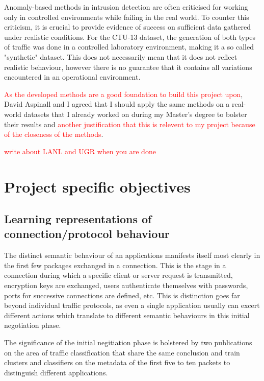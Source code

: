 \documentclass[a4paper,12pt,twoside]{report}
\begin{document}
Anomaly-based methods in intrusion detection are often criticised for working only in controlled environments while failing in the real world. To counter this criticism, it is crucial to provide evidence of success on sufficient data gathered under realistic conditions. For the CTU-13 dataset, the generation of both types of traffic was done in a controlled laboratory environment, making it a so called "synthetic" dataset. This does not necessarily mean that it does not reflect realistic behaviour, however there is no guarantee that it contains all variations encountered in an operational environment. 

\textcolor{red}{As the developed methods are a good foundation to build this project upon}, David Aspinall and I agreed that I should apply the same methods on a real-world datasets that I already worked on during my Master's degree to bolster their results and \textcolor{red}{another justification that this is relevent to my project because of the closeness of the methods}. 

\textcolor{red}{write about LANL and UGR when you are done}

\section{Project specific objectives}


\subsection{Learning representations of connection/protocol behaviour}

The distinct semantic behaviour of an applications manifests itself most clearly in the first few packages exchanged in a connection. This is the stage in a connection during which a specific client or server request is transmitted, encryption keys are exchanged, users authenticate themselves with passwords, ports for successive connections are defined, etc. This is distinction goes far beyond individual traffic protocols, as even a single application usually can excert different actions which translate to different semantic behaviours in this initial negotiation phase. 

The significance of the initial negitiation phase is bolstered by two publications on the area of traffic classification that share the same conclusion and train clusters and classifiers on the metadata of the first five to ten packets to distinguish different applications\cite{bernaille2006traffic,crotti2007traffic}.
\end{document}
